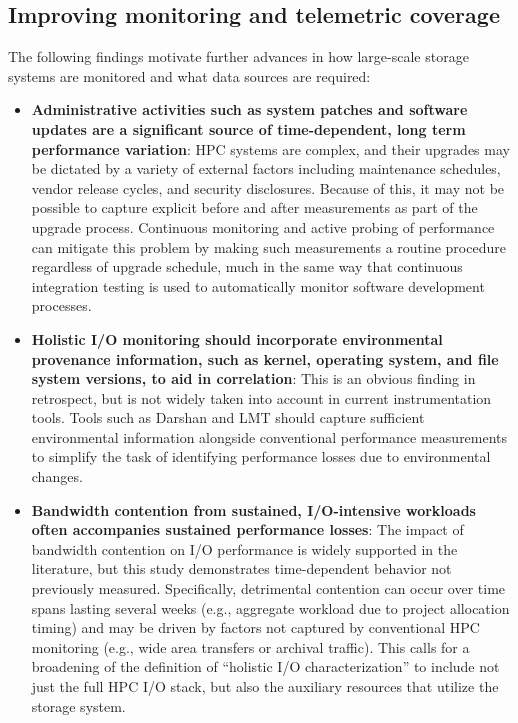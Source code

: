 \subsection{Improving monitoring and telemetric coverage}

The following findings motivate further advances in how large-scale storage systems are monitored and what data sources are required:


\begin{itemize}[leftmargin=*]

\item \textbf{Administrative activities such as system patches and
software updates are a significant source of time-dependent, long term
performance variation}:
HPC systems are complex, and their upgrades may be dictated by a variety of external factors including maintenance schedules, vendor release cycles, and security disclosures.
Because of this, it may not be possible to capture explicit before and after measurements as part of the upgrade process.
Continuous monitoring and active probing of performance can mitigate this problem by making such measurements a routine procedure regardless of upgrade schedule, much in the same way that continuous integration testing is used to automatically monitor software development processes.

\item \textbf{Holistic I/O monitoring should incorporate environmental
provenance information, such as kernel, operating system, and file system versions, to aid in correlation}: 
This is an obvious finding in retrospect, but is not widely taken into
account in current instrumentation tools.
Tools such as Darshan and LMT should capture sufficient environmental information alongside conventional performance measurements to
simplify the task of identifying performance losses due to environmental changes.

\item \textbf{Bandwidth contention from sustained, I/O-intensive workloads often accompanies sustained performance losses}:
The impact of bandwidth contention on I/O performance is widely supported in the literature, but this study demonstrates time-dependent behavior not previously measured.
Specifically, detrimental contention
can occur over time spans lasting several weeks (e.g., aggregate
workload due to project allocation timing) and may be driven by factors 
not captured by conventional HPC monitoring (e.g., wide area transfers or archival traffic).
This calls for a broadening of the definition of ``holistic I/O characterization'' to include not just the full HPC I/O stack, but also the auxiliary resources that utilize the storage system.

\end{itemize}


